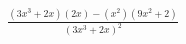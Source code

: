 \documentclass[preview]{standalone}
\begin{document}
\begin{align*}
\frac{(3x^3+2x)(2x)-(x^2)(9x^2+2)}{(3x^3+2x)^2}
\end{align*}
\end{document}
